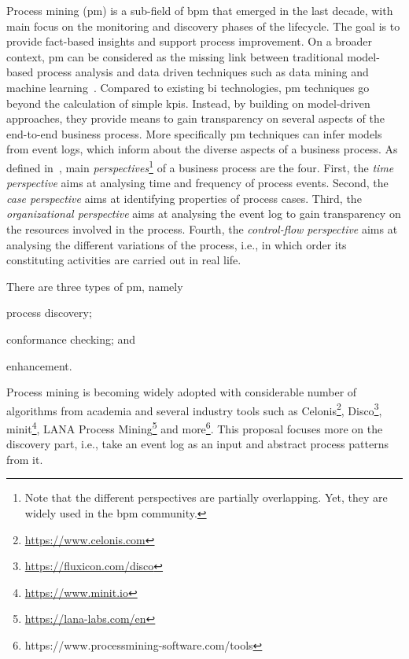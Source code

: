 Process mining (\gls{pm}) is a sub-field of \gls{bpm} that emerged in the last decade, with main focus on the monitoring and discovery phases of the lifecycle. The goal is to provide fact-based insights and support process improvement. On a broader context, \gls{pm} can be considered as the missing link between traditional model-based process analysis and data driven techniques such as data mining and machine learning~\citep{DBLP:books/sp/Aalst16}. Compared to existing \gls{bi} technologies, \gls{pm} techniques go beyond the calculation of simple \glspl{kpi}. Instead, by building on model-driven approaches, they provide means to gain transparency on several aspects of the end-to-end business process. More specifically \gls{pm} techniques can infer models from event logs, which inform about the diverse aspects of a business process.
As defined in~\citep{DBLP:books/sp/Aalst16}, main \emph{perspectives}\footnote{Note that the different perspectives are partially overlapping. Yet, they are widely used in the \gls{bpm} community.} of a business process are the four. First, the \emph{time perspective} aims at analysing time and frequency of process events. Second, the \emph{case perspective} aims at identifying properties of process cases. Third, the \emph{organizational perspective} aims at analysing the event log to gain transparency on the resources involved in the process. Fourth, the \emph{control-flow perspective} aims at analysing the different variations of the process, i.e., in which order its constituting activities are carried out in real life. 


There are three types of \gls{pm}, namely \begin{inparaenum}[\itshape i)]
	\item process discovery;
	\item conformance checking; and
	\item enhancement.
\end{inparaenum}
Process mining is becoming widely adopted with considerable number of algorithms from academia and several industry tools such as Celonis\footnote{\url{https://www.celonis.com}}, Disco\footnote{\url{https://fluxicon.com/disco}}, minit\footnote{\url{https://www.minit.io}}, LANA Process Mining\footnote{\url{https://lana-labs.com/en}} and more\footnote{https://www.processmining-software.com/tools}. 
This proposal focuses more on the discovery part, i.e., take an event log as an input and abstract process patterns from it. 


